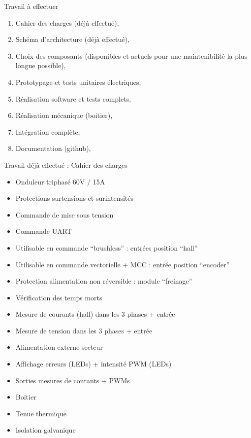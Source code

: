 \documentclass[aspectratio=169]{beamer}
\begin{document}
\begin{frame}{Travail à effectuer}
\begin{enumerate}
	\item Cahier des charges (déjà effectué),
	\item Schéma d'architecture (déjà effectué),
	\item Choix des composants (disponibles et actuels pour une maintenibilité la plus longue possible),
	\item Prototypage et tests unitaires électriques,
	\item Réalisation software et tests complets,
	\item Réalisation mécanique (boitier),
	\item Intégration complète,
	\item Documentation (github),
\end{enumerate}
\end{frame}

\begin{frame}{Travail déjà effectué : Cahier des charges}
\begin{itemize}
	\item Onduleur triphasé 60V / 15A
	\item Protections surtensions et surintensités
	\item Commande de mise sous tension
	\item Commande UART
	\item Utilisable en commande ``brushless'' :  entrées position ``hall'' 
	\item Utilisable en commande vectorielle + MCC : entrée position ``encoder''
	\item Protection alimentation non réversible : module ``freinage''
	\item Vérification des temps morts
	\item Mesure de courants (hall) dans les 3 phases + entrée
	\item Mesure de tension dans les 3 phases + entrée
	\item Alimentation externe secteur
	\item Affichage erreurs (LEDs) + intensité PWM (LEDs)
	\item Sorties mesures de courants + PWMs
	\item Boitier
	\item Tenue thermique
	\item Isolation galvanique
\end{itemize}
\end{frame}
\end{document}
